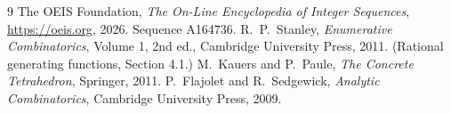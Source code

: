 \documentclass[11pt,a4paper]{article}
\theoremstyle{plain}
\theoremstyle{definition}
\begin{document}
\begin{thebibliography}{9}
 The OEIS Foundation, \emph{The On-Line Encyclopedia of Integer
Sequences}, \url{https://oeis.org}, 2026. Sequence A164736.
 R.~P.~Stanley, \emph{Enumerative Combinatorics}, Volume 1, 2nd ed.,
Cambridge University Press, 2011. (Rational generating functions, Section 4.1.)
 M.~Kauers and P.~Paule, \emph{The Concrete Tetrahedron}, Springer, 2011.
 P.~Flajolet and R.~Sedgewick, \emph{Analytic Combinatorics}, Cambridge
University Press, 2009.
\end{thebibliography}
\end{document}
